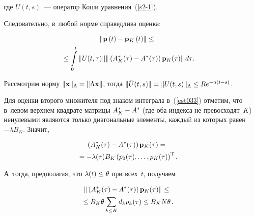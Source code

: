 \begin{multicols}{2}
\vspace*{-2pt}

\noindent
где $U(t,s)$~--- оператор Коши уравнения~(\ref{s2-1}).



Следовательно, в~любой норме справедлива оценка:

\vspace*{-4pt}

\noindent
\begin{multline}
\left\|
\mathbf{p}\left(t\right)-
\mathbf{p}_K\left(t\right)\right\|\le{}\\
{}\le 
\int\limits_0^t \|{U}(t,\tau)\| \|\left(A^*_K(\tau)- A^*(\tau)\right)
{\bf p}_K (\tau)\| \, d\tau . 
\label{est033}
\end{multline}

\vspace*{-4pt}

Рассмотрим норму $\|{\bf x}\|_{\Lambda}\hm=\|\Lambda{\bf x}\|$,
 тогда $\|\tilde{U}(t,s)\|\hm= \|U(t,s)\|_{\Lambda} \hm\le Re^{-a(t-s)}$.


Для оценки второго множителя под знаком интеграла в~(\ref{est033}) 
отметим, что в~левом верхнем квадрате матрицы $A^*_K\hm- A^*$ (где оба индекса не превосходят~$K$) 
ненулевыми являются только диагональные элементы, каждый из которых равен $-\lambda B_K$.
Значит,

\vspace*{-4pt}

\noindent 
\begin{multline*}
\left(A^*_K(\tau)- A^*(\tau)\right){{\bf p}_K (\tau)} = {}\\
{}=
- \lambda (\tau) B_K \left(p_0(\tau), \dots, p_K(\tau)\right)^{\mathrm{T}}.
\end{multline*}

\vspace*{-2pt}

\noindent
А~тогда, предполагая, что $\lambda(t) \hm\le \theta$ при всех~$t$, получаем 

\vspace*{-4pt}

\noindent
\begin{multline*}
\|\left(A^*_K(\tau)- A^*(\tau)\right){{\bf p}_K (\tau)}\|\le{}\\
{}\le  B_K\theta 
\sum\limits_{k \le K}d_kp_k(\tau) \le
B_K N \theta\,.
\end{multline*}


\vspace*{-2pt}


\end{multicols}
